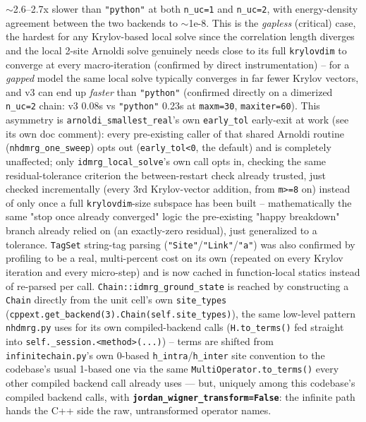 \documentclass[11pt]{article}
\begin{document}
$\sim$2.6--2.7x slower than \texttt{"python"} at both \texttt{n\_uc=1}
and \texttt{n\_uc=2}, with energy-density agreement between the two
backends to $\sim$1e-8. This is the \emph{gapless} (critical) case, the
hardest for any Krylov-based local solve since the correlation length
diverges and the local 2-site Arnoldi solve genuinely needs close to
its full \texttt{krylovdim} to converge at every macro-iteration
(confirmed by direct instrumentation) -- for a \emph{gapped} model the
same local solve typically converges in far fewer Krylov vectors, and
v3 can end up \emph{faster} than \texttt{"python"} (confirmed directly
on a dimerized \texttt{n\_uc=2} chain: v3 0.08s vs \texttt{"python"}
0.23s at \texttt{maxm=30}, \texttt{maxiter=60}). This asymmetry is
\texttt{arnoldi\_smallest\_real}'s own \texttt{early\_tol} early-exit at
work (see its own doc comment): every pre-existing caller of that
shared Arnoldi routine (\texttt{nhdmrg\_one\_sweep}) opts out
(\texttt{early\_tol<0}, the default) and is completely unaffected; only
\texttt{idmrg\_local\_solve}'s own call opts in, checking the same
residual-tolerance criterion the between-restart check already
trusted, just checked incrementally (every 3rd Krylov-vector addition,
from \texttt{m>=8} on) instead of only once a full
\texttt{krylovdim}-size subspace has been built -- mathematically the
same "stop once already converged" logic the pre-existing "happy
breakdown" branch already relied on (an exactly-zero residual), just
generalized to a tolerance. \texttt{TagSet} string-tag parsing
(\texttt{"Site"}/\texttt{"Link"}/\texttt{"a"}) was also confirmed by
profiling to be a real, multi-percent cost on its own (repeated on
every Krylov iteration and every micro-step) and is now cached in
function-local statics instead of re-parsed per call.
\texttt{Chain::idmrg\_ground\_state} is reached by constructing a
\texttt{Chain} directly from the unit cell's own
\texttt{site\_types} (\texttt{cppext.get\_backend(3).Chain(self.site\_types)}),
the same low-level pattern \texttt{nhdmrg.py} uses for its own
compiled-backend calls (\texttt{H.to\_terms()} fed straight into
\texttt{self.\_session.<method>(...)}) -- terms are shifted from
\texttt{infinitechain.py}'s own 0-based \texttt{h\_intra}/\texttt{h\_inter}
site convention to the codebase's usual 1-based one via the same
\texttt{MultiOperator.to\_terms()} every other compiled backend call
already uses --- but, uniquely among this codebase's compiled backend
calls, with \textbf{\texttt{jordan\_wigner\_transform=False}}: the
infinite path hands the C++ side the raw, untransformed operator names.
\end{document}
